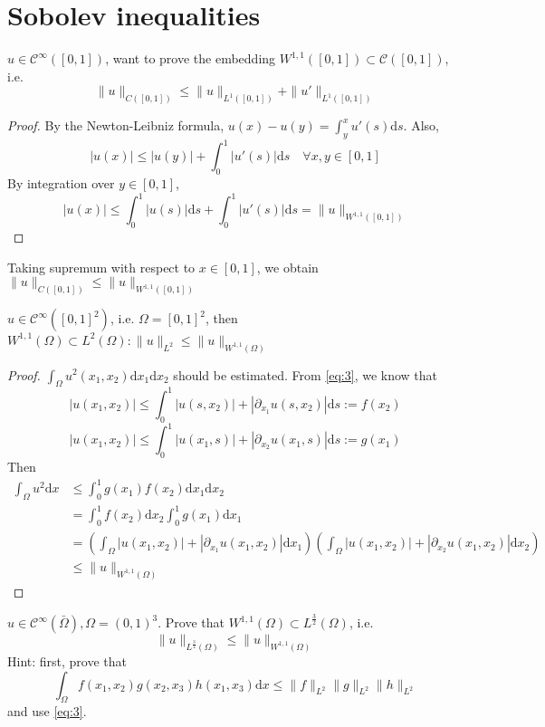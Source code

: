 \documentclass{report}
\begin{document}
\section{Sobolev inequalities}
{
    $u \in \mathcal{C}^{\infty}([0,1])$, want to prove the embedding $W^{1, 1}([0,1]) \subset \mathcal{C}([0,1])$, i.e.
    \begin{equation}\label{eq:3}
        \|u\|_{C([0,1])} \leq \|u\|_{L^{1}([0,1])} + \|u'\|_{L^{1}([0,1])}
    \end{equation}
}

\begin{proof}
    By the Newton-Leibniz formula, $u(x) - u(y) = \int_{y}^{x} u'(s) \mathrm{d}s$. Also,
    $$|u(x)| \leq |u(y)| + \int_{0}^{1} |u'(s)| \mathrm{d}s \quad \forall x, y \in [0,1]$$
    By integration over $y \in [0,1]$, 
    $$|u(x)| \leq \int_{0}^{1} |u(s)| \mathrm{d}s + \int_{0}^{1} |u'(s)| \mathrm{d}s = \|u\|_{W^{1, 1}([0, 1])}$$
\end{proof}

Taking supremum with respect to $x \in [0,1]$, we obtain $\|u\|_{C([0,1])} \leq \|u\|_{W^{1, 1}([0, 1])}$

{
    $u \in \mathcal{C}^{\infty}([0,1]^2)$,  i.e. $\Omega = [0,1]^2$, then $W^{1, 1}(\Omega) \subset L^{2}(\Omega) : \|u\|_{L^{2}} \leq \|u\|_{W^{1, 1}(\Omega)}$
}

\begin{proof}
    $\int_{\Omega} u^{2}(x_1, x_2) \mathrm{d}x_1 \mathrm{d}x_2$ should be estimated. From \ref{eq:3}, we know that 
    $$|u(x_1, x_2)| \leq \int_{0}^{1} |u(s, x_2)| + |\partial_{x_1} u(s, x_2)| \mathrm{d}s := f(x_2)$$
    $$|u(x_1, x_2)| \leq \int_{0}^{1} |u(x_1, s)| + |\partial_{x_2} u(x_1, s)| \mathrm{d}s := g(x_1)$$  
    Then 
    \begin{align*}
        \int_{\Omega} u^2 \mathrm{d}x &\leq \int_{0}^{1} g(x_1)f(x_2) \mathrm{d}x_1 \mathrm{d}x_2 \\
        &= \int_{0}^{1} f(x_2) \mathrm{d}x_2 \int_{0}^{1} g(x_1) \mathrm{d}x_1 \\
        &= \left(\int_{\Omega} |u(x_1, x_2)| + |\partial_{x_1} u(x_1, x_2)| \mathrm{d}x_1 \right) \left(\int_{\Omega} |u(x_1, x_2)| + |\partial_{x_2} u(x_1, x_2)| \mathrm{d}x_2 \right) \\
        &\leq \|u\|_{W^{1, 1}(\Omega)}
    \end{align*}
\end{proof}

{
    $u \in \mathcal{C}^{\infty}(\bar{\Omega}), \Omega = (0,1)^3$. Prove that $W^{1, 1}(\Omega) \subset L^{\frac{3}{2}}(\Omega)$, i.e.
    \begin{equation}\label{eq:4}
        \|u\|_{L^{\frac{3}{2}}(\Omega)} \leq \|u\|_{W^{1, 1}(\Omega)}
    \end{equation}
    Hint: first, prove that
    $$\int_{\Omega} f(x_1, x_2)g(x_2, x_3)h(x_1, x_3) \mathrm{d}x \leq \|f\|_{L^{2}} \|g\|_{L^{2}} \|h\|_{L^{2}}$$
    and use \ref{eq:3}.
}
\end{document}

